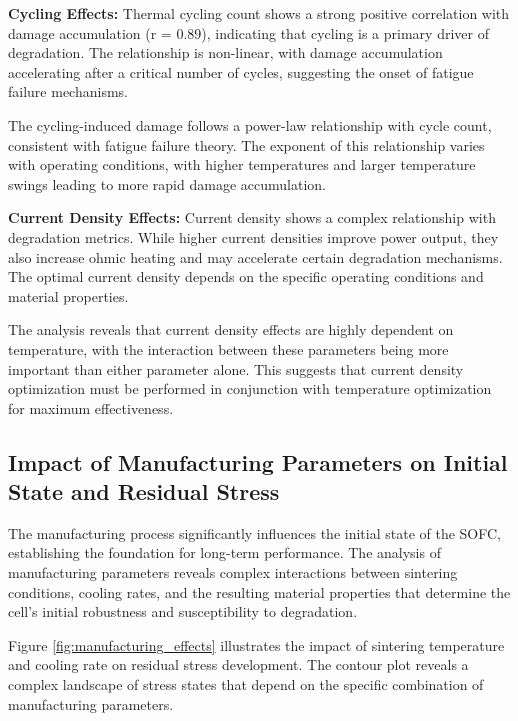 \documentclass[conference]{IEEEtran}
\begin{document}
\textbf{Cycling Effects:} Thermal cycling count shows a strong positive correlation with damage accumulation (r = 0.89), indicating that cycling is a primary driver of degradation. The relationship is non-linear, with damage accumulation accelerating after a critical number of cycles, suggesting the onset of fatigue failure mechanisms.

The cycling-induced damage follows a power-law relationship with cycle count, consistent with fatigue failure theory. The exponent of this relationship varies with operating conditions, with higher temperatures and larger temperature swings leading to more rapid damage accumulation.

\textbf{Current Density Effects:} Current density shows a complex relationship with degradation metrics. While higher current densities improve power output, they also increase ohmic heating and may accelerate certain degradation mechanisms. The optimal current density depends on the specific operating conditions and material properties.

The analysis reveals that current density effects are highly dependent on temperature, with the interaction between these parameters being more important than either parameter alone. This suggests that current density optimization must be performed in conjunction with temperature optimization for maximum effectiveness.

\subsection{Impact of Manufacturing Parameters on Initial State and Residual Stress}

The manufacturing process significantly influences the initial state of the SOFC, establishing the foundation for long-term performance. The analysis of manufacturing parameters reveals complex interactions between sintering conditions, cooling rates, and the resulting material properties that determine the cell's initial robustness and susceptibility to degradation.

Figure \ref{fig:manufacturing_effects} illustrates the impact of sintering temperature and cooling rate on residual stress development. The contour plot reveals a complex landscape of stress states that depend on the specific combination of manufacturing parameters.
\end{document}
